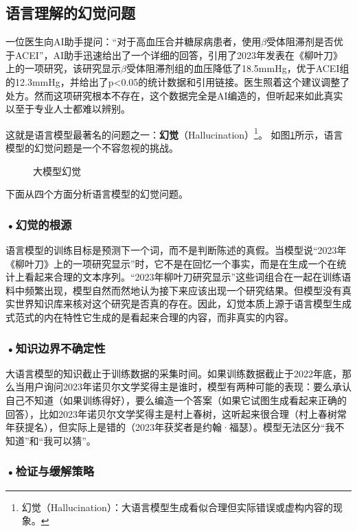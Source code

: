 \subsection{语言理解的幻觉问题}
一位医生向AI助手提问：“对于高血压合并糖尿病患者，使用$\beta$受体阻滞剂是否优于ACEI”，AI助手迅速给出了一个详细的回答，引用了2023年发表在《柳叶刀》上的一项研究，该研究显示$\beta$受体阻滞剂组的血压降低了18.5mmHg，优于ACEI组的12.3mmHg，并给出了p<0.05的统计数据和引用链接。医生照着这个建议调整了处方。然而这项研究根本不存在，这个数据完全是AI编造的，但听起来如此真实以至于专业人士都难以辨别。

这就是语言模型最著名的问题之一：\textbf{幻觉}（Hallucination）\footnote{幻觉（Hallucination）：大语言模型生成看似合理但实际错误或虚构内容的现象。}。
如图\ref{fig:ch2_2_27}所示，语言模型的幻觉问题是一个不容忽视的挑战。
\begin{figure}[H]
\centering
{}
\caption{大模型幻觉}
\label{fig:ch2_2_27}
\end{figure}


下面从四个方面分析语言模型的幻觉问题。

\subsubsection*{\textbf{•幻觉的根源}}

语言模型的训练目标是预测下一个词，而不是判断陈述的真假。当模型说“2023年《柳叶刀》上的一项研究显示”时，它不是在回忆一个事实，而是在生成一个在统计上看起来合理的文本序列。“2023年柳叶刀研究显示”这些词组合在一起在训练语料中频繁出现，模型自然而然地认为接下来应该出现一个研究结果。但模型没有真实世界知识库来核对这个研究是否真的存在。因此，幻觉本质上源于语言模型生成式范式的内在特性它生成的是看起来合理的内容，而非真实的内容。

\subsubsection*{\textbf{•知识边界不确定性}}

大语言模型的知识截止于训练数据的采集时间。如果训练数据截止于2022年底，那么当用户询问2023年诺贝尔文学奖得主是谁时，模型有两种可能的表现：要么承认自己不知道（如果训练得好），要么编造一个答案（如果它试图生成看起来正确的回答），比如2023年诺贝尔文学奖得主是村上春树，这听起来很合理（村上春树常年获提名），但实际上是错的（2023年获奖者是约翰·福瑟）。模型无法区分“我不知道”和“我可以猜”。

\subsubsection*{\textbf{•检证与缓解策略}}

